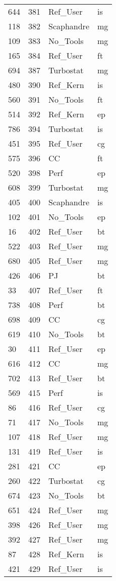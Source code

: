 \begin{tabular}{lrll}
644 & 381 & Ref_User & is \\
118 & 382 & Scaphandre & mg \\
109 & 383 & No_Tools & mg \\
165 & 384 & Ref_User & ft \\
694 & 387 & Turbostat & mg \\
480 & 390 & Ref_Kern & is \\
560 & 391 & No_Tools & ft \\
514 & 392 & Ref_Kern & ep \\
786 & 394 & Turbostat & is \\
451 & 395 & Ref_User & cg \\
575 & 396 & CC & ft \\
520 & 398 & Perf & ep \\
608 & 399 & Turbostat & mg \\
405 & 400 & Scaphandre & is \\
102 & 401 & No_Tools & ep \\
16 & 402 & Ref_User & bt \\
522 & 403 & Ref_User & mg \\
680 & 405 & Ref_User & mg \\
426 & 406 & PJ & bt \\
33 & 407 & Ref_User & ft \\
738 & 408 & Perf & bt \\
698 & 409 & CC & cg \\
619 & 410 & No_Tools & bt \\
30 & 411 & Ref_User & ep \\
616 & 412 & CC & mg \\
702 & 413 & Ref_User & bt \\
569 & 415 & Perf & is \\
86 & 416 & Ref_User & cg \\
71 & 417 & No_Tools & mg \\
107 & 418 & Ref_User & mg \\
131 & 419 & Ref_User & is \\
281 & 421 & CC & ep \\
260 & 422 & Turbostat & cg \\
674 & 423 & No_Tools & bt \\
651 & 424 & Ref_User & mg \\
398 & 426 & Ref_User & mg \\
392 & 427 & Ref_User & mg \\
87 & 428 & Ref_Kern & is \\
421 & 429 & Ref_User & is \\

\end{tabular}
